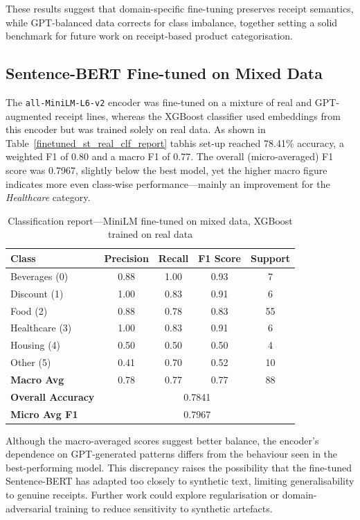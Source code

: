 \documentclass{SGGW-thesis-EN}
\begin{document}
These results suggest that domain-specific fine-tuning preserves receipt semantics, while GPT-balanced data corrects
for class imbalance, together setting a solid benchmark for future work on receipt-based product categorisation.

\subsection{Sentence-BERT Fine-tuned on Mixed Data}
The \texttt{all-MiniLM-L6-v2} encoder was fine-tuned on a mixture of real and GPT-augmented receipt lines, whereas the
XGBoost classifier used embeddings from this encoder but was trained solely on real data. As shown in Table~\ref{finetuned_st_real_clf_report} tabhis set-up reached
78.41\% accuracy, a weighted F1 of 0.80 and a macro F1 of 0.77. The overall
(micro-averaged) F1 score was 0.7967, slightly below the best model, yet the higher macro figure
indicates more even class-wise performance—mainly an improvement for the \emph{Healthcare} category.

\begin{table}
  \centering
  \caption{Classification report—MiniLM fine-tuned on mixed data, XGBoost trained on real data}
  \label{tab:finetuned_st_real_clf_report}
  \begin{tabularx}{\textwidth}{lcccc}
    \toprule
    \textbf{Class} & \textbf{Precision} & \textbf{Recall} & \textbf{F1 Score} & \textbf{Support} \\
    \midrule
    Beverages (0)  & 0.88 & 1.00 & 0.93 & 7  \\
    Discount  (1)  & 1.00 & 0.83 & 0.91 & 6  \\
    Food      (2)  & 0.88 & 0.78 & 0.83 & 55 \\
    Healthcare (3) & 1.00 & 0.83 & 0.91 & 6  \\
    Housing    (4) & 0.50 & 0.50 & 0.50 & 4  \\
    Other      (5) & 0.41 & 0.70 & 0.52 & 10 \\
    \midrule
    \textbf{Macro Avg}        & 0.78 & 0.77 & 0.77 & 88 \\
    \textbf{Overall Accuracy} & \multicolumn{4}{c}{0.7841} \\
    \textbf{Micro Avg F1}     & \multicolumn{4}{c}{0.7967} \\
    \bottomrule
  \end{tabularx}
\end{table}
\noindent Although the macro-averaged scores suggest better balance, the encoder’s dependence on GPT-generated patterns differs
from the behaviour seen in the best-performing model. This discrepancy raises the possibility that the fine-tuned
Sentence-BERT has adapted too closely to synthetic text, limiting generalisability to genuine receipts. Further work
could explore regularisation or domain-adversarial training to reduce sensitivity to synthetic artefacts.
\end{document}
